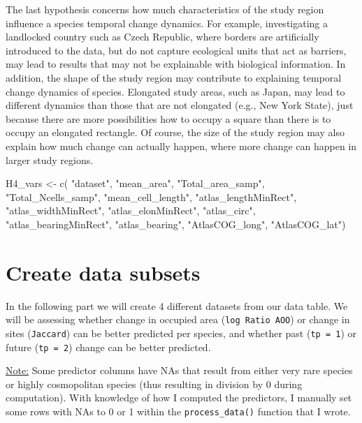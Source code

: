 \documentclass[
  letterpaper,
  DIV=11,
  numbers=noendperiod]{scrreprt}
\newenvironment{Shaded}{\begin{snugshade}}{\end{snugshade}}
\newcommand{\FunctionTok}[1]{\textcolor[rgb]{0.28,0.35,0.67}{#1}}
\newcommand{\NormalTok}[1]{\textcolor[rgb]{0.00,0.23,0.31}{#1}}
\newcommand{\OtherTok}[1]{\textcolor[rgb]{0.00,0.23,0.31}{#1}}
\newcommand{\StringTok}[1]{\textcolor[rgb]{0.13,0.47,0.30}{#1}}
\begin{document}
The last hypothesis concerns how much characteristics of the study
region influence a species temporal change dynamics. For example,
investigating a landlocked country such as Czech Republic, where borders
are artificially introduced to the data, but do not capture ecological
units that act as barriers, may lead to results that may not be
explainable with biological information. In addition, the shape of the
study region may contribute to explaining temporal change dynamics of
species. Elongated study areas, such as Japan, may lead to different
dynamics than those that are not elongated (e.g., New York State), just
because there are more possibilities how to occupy a square than there
is to occupy an elongated rectangle. Of course, the size of the study
region may also explain how much change can actually happen, where more
change can happen in larger study regions.

\begin{Shaded}
\begin{Highlighting}[]
\NormalTok{H4\_vars }\OtherTok{\textless{}{-}} \FunctionTok{c}\NormalTok{(}
    \StringTok{"dataset"}\NormalTok{, }\StringTok{"mean\_area"}\NormalTok{, }\StringTok{"Total\_area\_samp"}\NormalTok{, }\StringTok{"Total\_Ncells\_samp"}\NormalTok{,}
    \StringTok{"mean\_cell\_length"}\NormalTok{, }\StringTok{"atlas\_lengthMinRect"}\NormalTok{, }\StringTok{"atlas\_widthMinRect"}\NormalTok{,}
    \StringTok{"atlas\_elonMinRect"}\NormalTok{, }\StringTok{"atlas\_circ"}\NormalTok{, }\StringTok{"atlas\_bearingMinRect"}\NormalTok{,}
    \StringTok{"atlas\_bearing"}\NormalTok{, }\StringTok{"AtlasCOG\_long"}\NormalTok{, }\StringTok{"AtlasCOG\_lat"}\NormalTok{)}
\end{Highlighting}
\end{Shaded}


\chapter{Create data subsets}\label{create-data-subsets}

In the following part we will create 4 different datasets from our data
table. We will be assessing whether change in occupied area
(\texttt{log\ Ratio\ AOO}) or change in sites (\texttt{Jaccard}) can be
better predicted per species, and whether past (\texttt{tp\ =\ 1}) or
future (\texttt{tp\ =\ 2}) change can be better predicted.

\ul{Note:} Some predictor columns have NAs that result from either very
rare species or highly cosmopolitan species (thus resulting in division
by 0 during computation). With knowledge of how I computed the
predictors, I manually set some rows with NAs to 0 or 1 within the
\texttt{process\_data()} function that I wrote.
\end{document}
